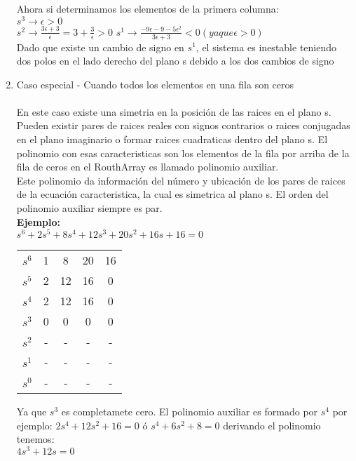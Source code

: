 \documentclass[
	12pt, %
]{fphw}
\begin{document}
\begin{enumerate}
  Ahora si determinamos los elementos de la primera columna:\\
  $s^3\rightarrow \epsilon > 0$\\
  $s^2\rightarrow \frac{3\epsilon+3}{\epsilon}=3+\frac{3}{\epsilon}>0$
  $s^1\rightarrow \frac{-9\epsilon-9-5\epsilon^2}{3\epsilon+3}<0 (ya que \epsilon >0)$\\

  Dado que existe un cambio de signo en $s^1$, el sistema es inestable teniendo dos polos en el lado derecho del plano s debido a los dos cambios de signo
\item Caso especial - Cuando todos los elementos en una fila son ceros\\\\
  En este caso existe una simetria en la posición de las raices en el plano s. Pueden existir pares de raices reales con signos contrarios o raices conjugadas en el plano imaginario o formar raices cuadraticas dentro del plano s. El polinomio con esas caracteristicas son los elementos de la fila por arriba de la fila de ceros en el RouthArray es llamado polinomio auxiliar.\\
  Este polinomio da información del número y ubicación de los pares de raices de la ecuación caracteristica, la cual es simetrica al plano s. El orden del polinomio auxiliar siempre es par.\\

  \textbf{Ejemplo:}\\

  $s^6+2s^5+8s^4+12s^3+20s^2+16s+16=0$\\

  \begin{center}
\begin{tabular}{c c c c c}
$s^{6}$ & 1 & 8 & 20 & 16 \\
$s^{5}$ & 2 & 12 & 16 & 0 \\
$s^{4}$ & 2 & 12 & 16 & 0\\
$s^{3}$ & 0 & 0 & 0 & 0 \\
  $s^{2}$ & - & - & - & -\\
  $s^{1}$ & - & - & - & -\\
  $s^{0}$ & - & - & - & - 
\end{tabular}  
\end{center}

  Ya que $s^3$ es completamete cero. El polinomio auxiliar es formado por $s^4$ por ejemplo: $2s^4+12s^2+16=0$ ó $s^4+6s^2+8=0$ derivando el polinomio tenemos: \\
  $4s^3+12s=0$\\


\end{enumerate}
\end{document}
